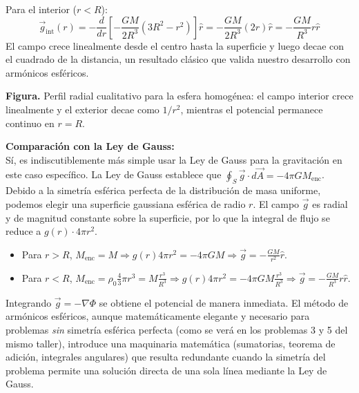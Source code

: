 \documentclass[a4paper]{article}
\begin{document}
Para el interior ($r < R$):
$$
\vec{g}_{\text{int}}(r) = -\frac{d}{dr} \left[ -\frac{GM}{2R^3} (3R^2 - r^2) \right] \hat{r} = -\frac{GM}{2R^3} (2r) \hat{r} = -\frac{GM}{R^3} r \hat{r}
$$
El campo crece linealmente desde el centro hasta la superficie y luego decae con el cuadrado de la distancia, un resultado clásico que valida nuestro desarrollo con armónicos esféricos.

\begin{center}

\par\smallskip
{\small\textbf{Figura.} Perfil radial cualitativo para la esfera homogénea: el campo interior crece linealmente y el exterior decae como $1/r^2$, mientras el potencial permanece continuo en $r=R$.}
\end{center}

\textbf{Comparación con la Ley de Gauss:} \\
Sí, es indiscutiblemente más simple usar la Ley de Gauss para la gravitación en este caso específico. La Ley de Gauss establece que $\oint_S \vec{g} \cdot d\vec{A} = -4\pi G M_{\text{enc}}$. 
Debido a la simetría esférica perfecta de la distribución de masa uniforme, podemos elegir una superficie gaussiana esférica de radio $r$. El campo $\vec{g}$ es radial y de magnitud constante sobre la superficie, por lo que la integral de flujo se reduce a $g(r) \cdot 4\pi r^2$. 
\begin{itemize}
    \item Para $r > R$, $M_{\text{enc}} = M \Rightarrow g(r) 4\pi r^2 = -4\pi G M \Rightarrow \vec{g} = -\frac{GM}{r^2}\hat{r}$.
    \item Para $r < R$, $M_{\text{enc}} = \rho_0 \frac{4}{3}\pi r^3 = M \frac{r^3}{R^3} \Rightarrow g(r) 4\pi r^2 = -4\pi G M \frac{r^3}{R^3} \Rightarrow \vec{g} = -\frac{GM}{R^3}r\hat{r}$.
\end{itemize}
Integrando $\vec{g} = -\nabla \Phi$ se obtiene el potencial de manera inmediata. El método de armónicos esféricos, aunque matemáticamente elegante y necesario para problemas \textit{sin} simetría esférica perfecta (como se verá en los problemas 3 y 5 del mismo taller), introduce una maquinaria matemática (sumatorias, teorema de adición, integrales angulares) que resulta redundante cuando la simetría del problema permite una solución directa de una sola línea mediante la Ley de Gauss.
\end{document}
